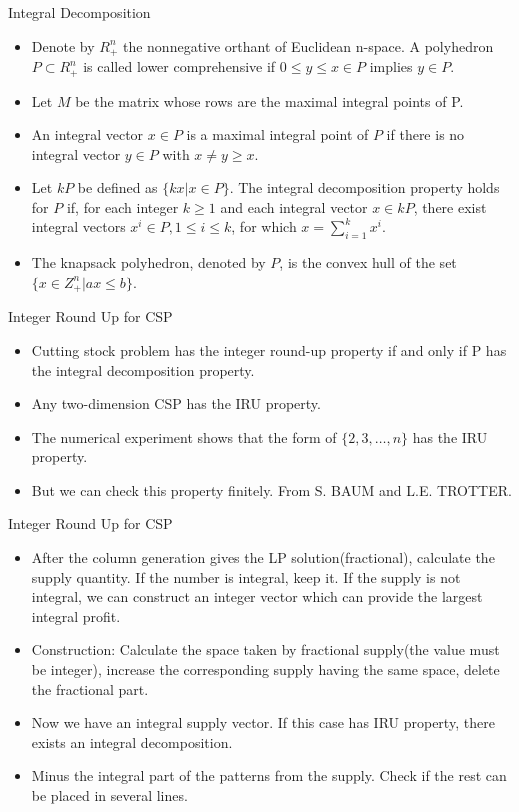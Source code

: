     \begin{frame}{Integral Decomposition}
      \begin{itemize}
        \item Denote by $R_+^n$ the nonnegative orthant of Euclidean n-space. A polyhedron $P \subset R_+^n$ is called lower comprehensive if $0 \leq y \leq x \in P$ implies $y \in P$.
        \item Let $M$ be the matrix whose rows are the maximal integral points of P.
        \item An integral vector $x \in P$ is a maximal integral point of $P$ if there is no integral vector $y \in P$ with $x \neq y \geq x$.
        \item Let $kP$ be defined as $\{kx|x \in P\}$.
        The integral decomposition property holds for
        $P$ if, for each integer $k \geq 1$ and each integral vector $x \in kP$, there exist integral vectors $x^i \in P, 1 \leq i \leq k$, for which $x = \sum_{i=1}^k x^i$.
        \item The knapsack polyhedron, denoted by $P$, is the convex hull of the set $\{x \in Z_+^n|ax \leq b\}$.
      \end{itemize}
    \end{frame}

    \begin{frame}{Integer Round Up for CSP}
      \begin{itemize}
        \item Cutting stock problem has the integer round-up property if and only if P has the integral decomposition property.
        \item Any two-dimension CSP has the IRU property.
        \item The numerical experiment shows that the form of $\{2,3,\ldots,n\}$ has the IRU property.
        \item But we can check this property finitely. From S. BAUM and L.E. TROTTER.
      \end{itemize}
    \end{frame}

    \begin{frame}{Integer Round Up for CSP}
      \begin{itemize}
        \item After the column generation gives the LP solution(fractional), calculate the supply quantity. If the number is integral, keep it.
        If the supply is not integral, we can construct an integer vector which can provide the largest integral profit.
        \item Construction: Calculate the space taken by fractional supply(the value must be integer), increase the corresponding supply having the same space, delete the fractional part.
        \item Now we have an integral supply vector. If this case has IRU property, there exists an integral decomposition.
        \item Minus the integral part of the patterns from the supply. Check if the rest can be placed in several lines.
      \end{itemize}
    \end{frame}



